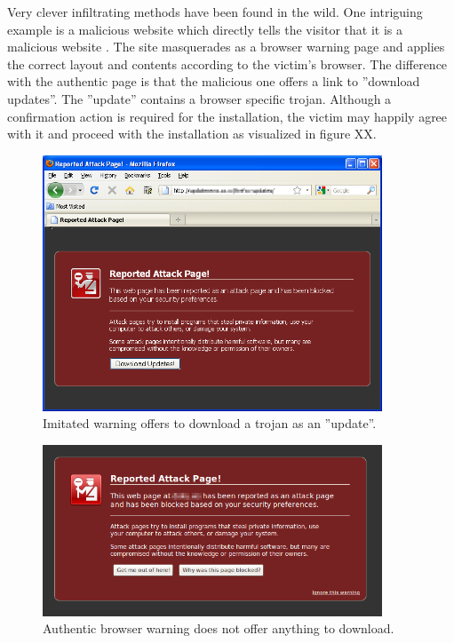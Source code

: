 \documentclass{tktltiki}
\begin{document}
    Very clever infiltrating methods have been found in the wild. One intriguing example is a malicious website which directly tells the visitor that it is a malicious website \cite{fsecure_webtrojan_2010}. The site masquerades as a browser warning page and applies the correct layout and contents according to the victim's browser. The difference with the authentic page is that the malicious one offers a link to ''download updates''. The ''update'' contains a browser specific trojan. Although a confirmation action is required for the installation, the victim may happily agree with it and proceed with the installation as visualized in figure XX. 

        
  \begin{figure}
    \centering
    \includegraphics[width=0.9\textwidth]{images/firefox_reported_attack_page_trojan.png}
    \caption{Imitated warning offers to download a trojan as an ''update''.}
    
    \label{fig:ff_malicious_warning}
  \end{figure}

  \begin{figure}
    \centering
    \includegraphics[width=0.9\textwidth]{images/firefox_reported_attack_page_authentic.png}
    \caption{Authentic browser warning does not offer anything to download.}
    
    \label{fig:ff_authentic_warning}
  \end{figure}
\end{document}
